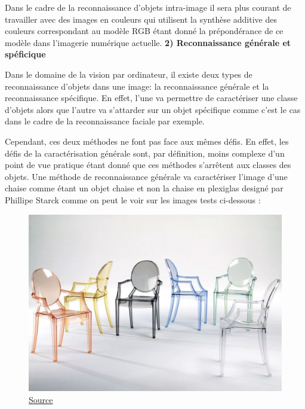 \documentclass[a4paper,12pt]{article} %
\begin{document}
\par
Dans le cadre de la reconnaissance d’objets intra-image il sera plus courant de travailler avec des images en couleurs qui utilisent la synthèse additive des couleurs correspondant au modèle RGB étant donné la prépondérance de ce modèle dans l’imagerie numérique actuelle.\newline
\newpage
\textbf{2) Reconnaissance générale et spéficique}
\newline
\par
	Dans le domaine de la vision par ordinateur, il existe deux types de reconnaissance d'objets dans une image: la reconnaissance générale et la reconnaissance spécifique. En effet, l’une va permettre de caractériser une classe d’objets alors que l’autre va s’attarder sur un objet spécifique comme c’est le cas dans le cadre de la reconnaissance faciale par exemple. 
\newline
\par
Cependant, ces deux méthodes ne font pas face aux mêmes défis. En effet, les défis de la caractérisation générale sont, par définition, moins complexe d’un point de vue pratique étant donné que ces méthodes s’arrêtent aux classes des objets. Une méthode de reconnaissance générale va caractériser l’image d’une chaise comme étant un objet chaise et non la chaise en plexiglas designé par Phillipe Starck comme on peut le voir sur les images tests ci-dessous : 
\newline
\begin{figure}[h] %
  \centering %
  \includegraphics[scale=0.2]{stark.jpg} %
  \caption{\href{https://www.elle.fr/Deco/Reportages/Les-pros/Philippe-Starck-le-designer-star-en-dix-realisations-iconiques}{Source} }
\end{figure}
\end{document}
